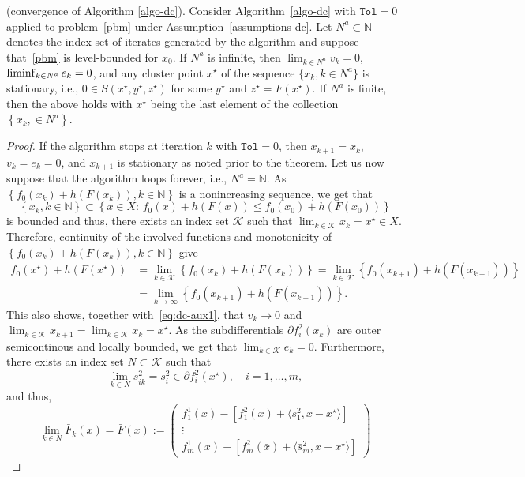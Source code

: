 \documentclass[smallextended,envcountsect]{svjour3}
\newcommand{\col}[1]{\left\{#1\right\}}
\newcommand{\tol}{\texttt{Tol}}
\newcommand{\inner}[2]{\langle#1,#2\rangle}
\newcommand{\nats}{\mathbb{N}}
\newcommand{\nliminf}{\mathop{\rm liminf}\nolimits}
\begin{document}
\begin{theorem}\label{theo:dc}{\rm (convergence of Algorithm \ref{algo-dc}).}
    Consider Algorithm~\ref{algo-dc} with $\tol=0$ applied to problem~\eqref{pbm} under Assumption~\ref{assumptions-dc}. 
    Let $N^a\subset \nats$ denotes the index set of iterates generated by the algorithm and suppose that~\eqref{pbm} is level-bounded for $x_0$. If $N^a$ is infinite, then $\lim_{k \in N^a}v_k = 0$, $\nliminf_{k \in N^a}e_k= 0$, and any cluster point $x^\star$ of the sequence $\{x_k,k\in N^a\}$ is stationary, i.e., $0 \in S(x^\star,y^\star,z^\star)$ for some $y^\star$ and $z^\star=F(x^\star)$. If $N^a$ is finite, then the above holds with $x^\star$ being the last element of the collection $\col{x_k, \in N^a}$.
\end{theorem}
\begin{proof}
If the algorithm stops at iteration $k$ with $\tol=0$, then $x_{k+1}=x_k$, $v_k=e_k=0$, and $x_{k+1}$ is stationary as noted prior to the theorem. Let us now suppose that the algorithm loops forever, i.e., $N^a=\nats$.  As $\col{f_0(x_{k})+h(F(x_{k})), k\in \nats}$ is a nonincreasing sequence, we get that 
\[\col{x_k, k\in \nats} \subset \col{x \in X:\, f_0(x)+h(F(x))\leq f_0(x_0)+h(F(x_0))}
\]
is  bounded and thus, there exists an index set $\mathcal{K}$ such that $\lim_{k  \in \mathcal{K}} x_{k} =x^\star \in X$. Therefore, continuity of the involved functions and monotonicity of $\col{f_0(x_{k})+h(F(x_{k})), k\in \nats}$ give 
\begin{align*}
f_0 ( x^\star) + h(F(x^\star))&=\lim_{k \in \mathcal{K}}\col{f_0(x_{k})+h(F(x_{k}))}=\lim_{k \in \mathcal{K}}\col{f_0(x_{k+1})+h(F(x_{k+1}))}\\
&=\lim_{k \to \infty}\col{f_0(x_{k+1})+h(F(x_{k+1}))}.
\end{align*}
 This also shows, together with~\eqref{eq:dc-aux1}, that $v_k \to 0$ and $\lim_{k  \in \mathcal{K}} x_{k+1}=\lim_{k  \in \mathcal{K}} x_{k} = x^\star$.
 As the subdifferentials $\partial f^2_i(x_k)$ are outer semicontinous and locally bounded, we get that $\lim_{k \in \mathcal{K}}e_k =0$. Furthermore, there exists an index set $N\subset \mathcal{K}$ such that
 \[
 \lim_{k \in N} s^2_{ik} = \bar s^2_i \in \partial f_i^2(x^\star), \quad i=1,\ldots,m,
 \]
 and thus,
\[
\lim_{k \in N} \bar F_k(x) = \bar F(x):=\begin{pmatrix}
    f_{1}^1(x)-[f_{1}^2(\bar x)+\inner{\bar s^2_{1}}{x-x^\star}]\\
    \vdots \\
    f_{m}^1(x)-[f_{m}^2(\bar x)+\inner{\bar s^2_{m}}{x-x^\star}]

\end{pmatrix}\]
\end{proof}
\end{document}
